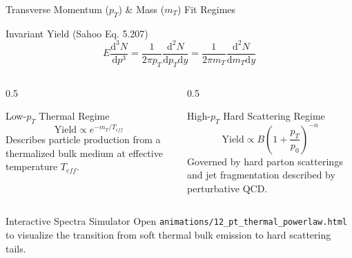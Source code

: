 \documentclass[aspectratio=169]{beamer}
\begin{document}
\begin{frame}{Transverse Momentum ($p_T$) \& Mass ($m_T$) Fit Regimes}
    \begin{block}{Invariant Yield (Sahoo Eq. 5.207)}
        \[ E \frac{\mathrm{d}^3N}{\mathrm{d}p^3} = \frac{1}{2\pi p_T} \frac{\mathrm{d}^2N}{\mathrm{d}p_T \mathrm{d}y} = \frac{1}{2\pi m_T} \frac{\mathrm{d}^2N}{\mathrm{d}m_T \mathrm{d}y} \]
    \end{block}
    \begin{columns}
        \begin{column}{0.5\textwidth}
            \begin{block}{Low-$p_T$ Thermal Regime}
                \small
                \[ \text{Yield} \propto e^{-m_T/T_{eff}} \]
                Describes particle production from a thermalized bulk medium at effective temperature $T_{eff}$.
            \end{block}
        \end{column}
        \begin{column}{0.5\textwidth}
            \begin{block}{High-$p_T$ Hard Scattering Regime}
                \small
                \[ \text{Yield} \propto B \left(1 + \frac{p_T}{p_0}\right)^{-n} \]
                Governed by hard parton scatterings and jet fragmentation described by perturbative QCD.
            \end{block}
        \end{column}
    \end{columns}
    \begin{alertblock}{Interactive Spectra Simulator}
        Open \texttt{animations/12\_pt\_thermal\_powerlaw.html} to visualize the transition from soft thermal bulk emission to hard scattering tails.
    \end{alertblock}
\end{frame}
\end{document}
